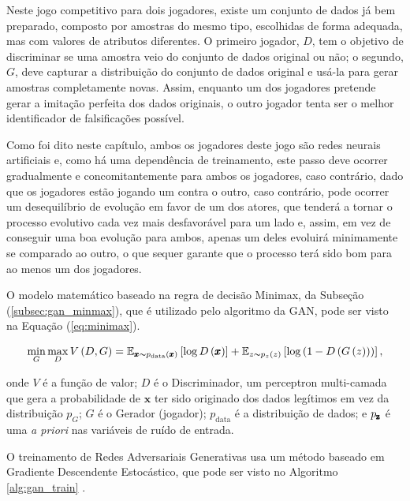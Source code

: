 Neste jogo competitivo para dois jogadores, existe um conjunto de dados já bem preparado, composto por amostras do mesmo tipo, escolhidas de forma adequada, mas com valores de atributos diferentes. O primeiro jogador, $D$, tem o objetivo de discriminar se uma amostra veio do conjunto de dados original ou não; o segundo, $G$, deve capturar a distribuição do conjunto de dados original e usá-la para gerar amostras completamente novas. Assim, enquanto um dos jogadores pretende gerar a imitação perfeita dos dados originais, o outro jogador tenta ser o melhor identificador de falsificações possível.

Como foi dito neste capítulo, ambos os jogadores deste jogo são redes neurais artificiais e, como há uma dependência de treinamento, este passo deve ocorrer gradualmente e concomitantemente para ambos os jogadores, caso contrário, dado que os jogadores estão jogando um contra o outro, caso contrário, pode ocorrer um desequilíbrio de evolução em favor de um dos atores, que tenderá a tornar o processo evolutivo cada vez mais desfavorável para um lado e, assim, em vez de conseguir uma boa evolução para ambos, apenas um deles evoluirá minimamente se comparado ao outro, o que sequer garante que o processo terá sido bom para ao menos um dos jogadores.

O modelo matemático baseado na regra de decisão Minimax, da Subseção (\ref{subsec:gan_minmax}), que é utilizado pelo algoritmo da GAN, pode ser visto na Equação (\ref{eq:minimax}).

\begin{equation}
    \min_{G} \max_{D} V\left(D, G\right) = \mathbb{E}_{\pmb{x}\thicksim p_{\text{data}}\left(\pmb{x}\right)}\left[\log D\left(\pmb{x}\right)\right] + \mathbb{E}_{z\thicksim p_{z}\left(z\right)}\left[\log \left(1 - D\left(G\left(z\right)\right)\right)\right],
    \label{eq:minimax}
\end{equation}

onde $V$ é a função de valor; $D$ é o Discriminador, um perceptron multi-camada que gera a probabilidade de $\pmb{x}$ ter sido originado dos dados legítimos em vez da distribuição $p_{G}$; $G$ é o Gerador (jogador); $p_{\text{data}}$ é a distribuição de dados; e $p_{\text{\pmb{z}}}$ é uma \textit{a priori} nas variáveis de ruído de entrada.

O treinamento de Redes Adversariais Generativas usa um método baseado em Gradiente Descendente Estocástico, que pode ser visto no Algoritmo \ref{alg:gan_train} \citep{NIPS2014_5423}.


